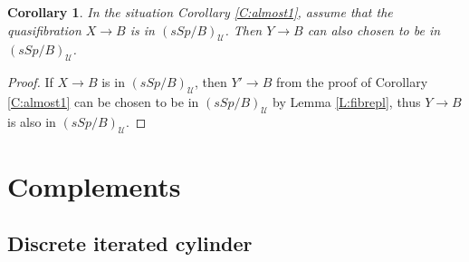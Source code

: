 \documentclass[12pt]{amsart}
\theoremstyle{plain}
\newtheorem{Cor}[Thm]{Corollary}
\theoremstyle{definition}
\newtheorem{Emp}[Thm]{}
\numberwithin{equation}{section}
\newcommand{\cal}[1]{\mathcal{#1}}
\newcommand{\C}[1]{\cal#1}
\newcommand{\rl}[1]{Lemma \ref{L:#1}}
\newcommand{\rco}[1]{Corollary \ref{C:#1}}
\begin{document}
\begin{Cor} \label{C:almost}
In the situation \rco{almost1}, assume that the quasifibration
$X\to B$ is in $(sSp/B)_{\C{U}}$. Then $Y\to B$ can also chosen to
be in $(sSp/B)_{\C{U}}$.
\end{Cor}

\begin{proof}
If $X\to B$ is in $(sSp/B)_{\C{U}}$, then $Y'\to B$ from the proof
of \rco{almost1} can be chosen to be in $(sSp/B)_{\C{U}}$ by
\rl{fibrepl}, thus $Y\to B$ is also in $(sSp/B)_{\C{U}}$.
\end{proof}


\section{Complements} \label{S:proofs} 
\subsection{Discrete iterated cylinder}
\end{document}
